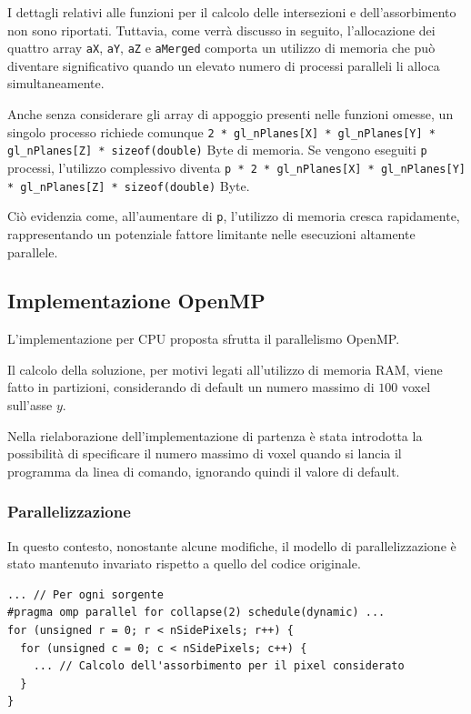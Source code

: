 \documentclass[12pt,a4paper]{report}
\begin{document}
I dettagli relativi alle funzioni per il calcolo delle intersezioni e dell'assorbimento non sono riportati.
Tuttavia, come verrà discusso in seguito, l'allocazione dei quattro array \lstinline{aX}, \lstinline{aY}, \lstinline{aZ} e
\lstinline{aMerged} comporta un utilizzo di memoria che può diventare significativo quando un elevato numero di processi paralleli
li alloca simultaneamente.

Anche senza considerare gli array di appoggio presenti nelle funzioni omesse, un singolo processo richiede comunque
\lstinline{2 * gl_nPlanes[X] * gl_nPlanes[Y] * gl_nPlanes[Z] * sizeof(double)} Byte di memoria.
Se vengono eseguiti \lstinline{p} processi, l'utilizzo complessivo diventa
\lstinline{p * 2 * gl_nPlanes[X] * gl_nPlanes[Y] * gl_nPlanes[Z] * sizeof(double)} Byte.

Ciò evidenzia come, all'aumentare di \lstinline{p}, l'utilizzo di memoria cresca rapidamente, rappresentando un potenziale fattore
limitante nelle esecuzioni altamente parallele.

\subsection{Implementazione OpenMP}

L'implementazione per CPU proposta sfrutta il parallelismo OpenMP.

Il calcolo della soluzione, per motivi legati all'utilizzo di memoria RAM, viene fatto in partizioni, considerando di default un
numero massimo di \(100\) voxel sull'asse \(y\).

Nella rielaborazione dell'implementazione di partenza è stata introdotta la possibilità di specificare il numero massimo di voxel
quando si lancia il programma da linea di comando, ignorando quindi il valore di default.

\subsubsection{Parallelizzazione}

In questo contesto, nonostante alcune modifiche, il modello di parallelizzazione è stato mantenuto invariato rispetto a quello del
codice originale.

\begin{lstlisting}[language=CStyle, caption={Codice C per il calcolo dell'assorbimento di un determinato pixel del rilevatore.}, label={lst:omp_D_point}]
... // Per ogni sorgente
#pragma omp parallel for collapse(2) schedule(dynamic) ...
for (unsigned r = 0; r < nSidePixels; r++) {
  for (unsigned c = 0; c < nSidePixels; c++) {
    ... // Calcolo dell'assorbimento per il pixel considerato
  }
}
\end{lstlisting}
\end{document}
